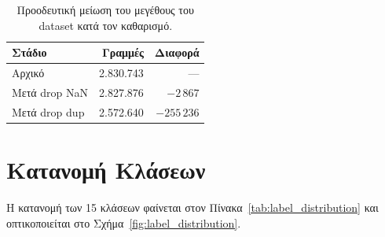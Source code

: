 \documentclass[12pt,a4paper,twoside]{book}
\begin{document}
\begin{table}[H]
    \centering
    \begin{tabular}{lrr}
        \toprule
        \textbf{Στάδιο} & \textbf{Γραμμές} & \textbf{Διαφορά}       \\
        \midrule
        Αρχικό           & 2.830.743        & ---                    \\
        Μετά drop NaN    & 2.827.876        & \(-2\,867\)            \\
        Μετά drop dup    & 2.572.640        & \(-255\,236\)          \\
        \bottomrule
    \end{tabular}
    \caption{Προοδευτική μείωση του μεγέθους του dataset κατά τον καθαρισμό.}
    \label{tab:cleaning_stages}
\end{table}

\section{Κατανομή Κλάσεων}

Η κατανομή των 15 κλάσεων φαίνεται στον Πίνακα~\ref{tab:label_distribution}
και οπτικοποιείται στο Σχήμα~\ref{fig:label_distribution}.
\end{document}
